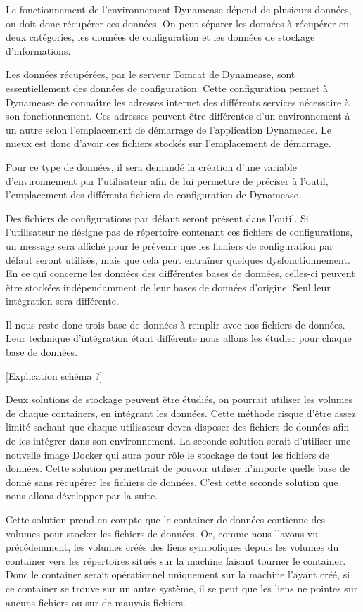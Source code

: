 Le fonctionnement de l'environnement Dynamease dépend de plusieurs données, on doit donc récupérer ces données. On peut séparer les données à récupérer en deux catégories, les données de configuration et les données de stockage d'informations.

Les données récupérées, par le serveur Tomcat de Dynamease, sont essentiellement des données de configuration. Cette configuration permet à Dynamease de connaître les adresses internet des différents services nécessaire à son fonctionnement. Ces adresses peuvent être différentes d'un environnement à un autre selon l'emplacement de démarrage de l'application Dynamease. Le mieux est donc d'avoir ces fichiers stockés sur l'emplacement de démarrage.

Pour ce type de données, il sera demandé la création d'une variable d'environnement par l'utilisateur afin de lui permettre de préciser à l'outil, l'emplacement des différents fichiers de configuration de Dynamease. 

Des fichiers de configurations par défaut seront présent dans l'outil. Si l'utilisateur ne désigne pas de répertoire contenant ces fichiers de configurations, un message sera affiché pour le prévenir que les fichiers de configuration par défaut seront utilisés, mais que cela peut entraîner quelques dysfonctionnement.\\

En ce qui concerne les données des différentes bases de données, celles-ci peuvent être stockées indépendamment de leur bases de données d'origine. Seul leur intégration sera différente.

Il nous reste donc trois base de données à remplir avec nos fichiers de données. Leur technique d'intégration étant différente nous allons les étudier pour chaque base de données. 

[Explication schéma ?] 

Deux solutions de stockage peuvent être étudiés, on pourrait utiliser les volumes de chaque containers, en intégrant les données. Cette méthode risque d'être assez limité sachant que chaque utilisateur devra disposer des fichiers de données afin de les intégrer dans son environnement. La seconde solution serait d'utiliser une nouvelle image Docker qui aura pour rôle le stockage de tout les fichiers de données. Cette solution permettrait de pouvoir utiliser n'importe quelle base de donné sans récupérer les fichiers de données. C'est cette seconde solution que nous allons développer par la suite.

Cette solution prend en compte que le container de données contienne des volumes pour stocker les fichiers de données. Or, comme nous l'avons vu précédemment, les volumes créés des liens symboliques depuis les volumes du container vers les répertoires situés sur la machine faisant tourner le container. Donc le container serait opérationnel uniquement sur la machine l'ayant créé, si ce container se trouve sur un autre système, il se peut que les liens ne pointes sur aucuns fichiers ou sur de mauvais fichiers. 

